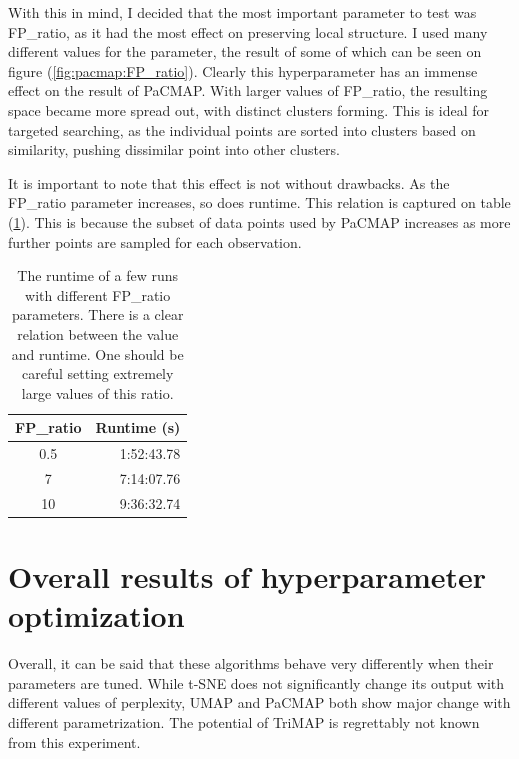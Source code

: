 With this in mind, I decided that the most important parameter to test was FP\_ratio, as it had the most effect on preserving local structure. I used many different values for the parameter, the result of some of which can be seen on figure (\ref{fig:pacmap:FP_ratio}). Clearly this hyperparameter has an immense effect on the result of PaCMAP. With larger values of FP\_ratio, the resulting space became more spread out, with distinct clusters forming. This is ideal for targeted searching, as the individual points are sorted into clusters based on similarity, pushing dissimilar point into other clusters.

It is important to note that this effect is not without drawbacks. As the FP\_ratio parameter increases, so does runtime. This relation is captured on table (\ref{tab:pacmap:runtime}). This is because the subset of data points used by PaCMAP increases as more further points are sampled for each observation.

\begin{table}
	\begin{center}
		\begin{tabular}{|c|r|}
			\hline
			FP\_ratio & Runtime (s)\\
			\hline 
			0.5 & 1:52:43.78 \\
			\hline
			7 & 7:14:07.76 \\
			\hline
			10 & 9:36:32.74 \\
			\hline
		\end{tabular}
	\end{center}
	\caption{The runtime of a few runs with different FP\_ratio parameters. There is a clear relation between the value and runtime. One should be careful setting extremely large values of this ratio.}
	\label{tab:pacmap:runtime}
\end{table}

\section{Overall results of hyperparameter optimization}\label{sec:overall-results-of-hyperparameter-optimization}

Overall, it can be said that these algorithms behave very differently when their parameters are tuned. While t-SNE does not significantly change its output with different values of perplexity, UMAP and PaCMAP both show major change with different parametrization. The potential of TriMAP is regrettably not known from this experiment.

